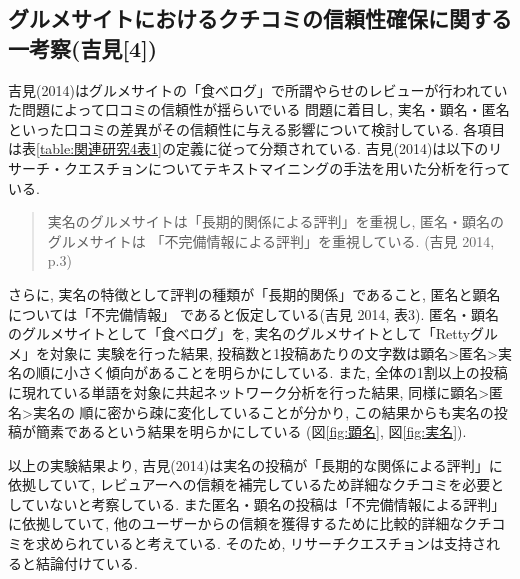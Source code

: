 \documentclass{ltjarticle}
\begin{document}
\subsection{グルメサイトにおけるクチコミの信頼性確保に関する一考察(吉見[4])}
吉見(2014)はグルメサイトの「食べログ」で所謂やらせのレビューが行われていた問題によって口コミの信頼性が揺らいでいる
問題に着目し, 実名・顕名・匿名といった口コミの差異がその信頼性に与える影響について検討している. 
各項目は表\ref{table:関連研究4表1}の定義に従って分類されている. 
吉見(2014)は以下のリサーチ・クエスチョンについてテキストマイニングの手法を用いた分析を行っている. 
\begin{quote}
    実名のグルメサイトは「長期的関係による評判」を重視し, 匿名・顕名のグルメサイトは
「不完備情報による評判」を重視している. (吉見 2014, p.3)
\end{quote}
さらに, 実名の特徴として評判の種類が「長期的関係」であること, 匿名と顕名については「不完備情報」
であると仮定している(吉見 2014, 表3). 
匿名・顕名のグルメサイトとして「食べログ」を, 実名のグルメサイトとして「Rettyグルメ」を対象に
実験を行った結果, 投稿数と1投稿あたりの文字数は顕名>匿名>実名の順に小さく傾向があることを明らかにしている. 
また, 全体の1割以上の投稿に現れている単語を対象に共起ネットワーク分析を行った結果, 同様に顕名>匿名>実名の
順に密から疎に変化していることが分かり, この結果からも実名の投稿が簡素であるという結果を明らかにしている
(図\ref{fig:顕名}, 図\ref{fig:実名}). 

以上の実験結果より, 吉見(2014)は実名の投稿が「長期的な関係による評判」に依拠していて, 
レビュアーへの信頼を補完しているため詳細なクチコミを必要としていないと考察している. 
また匿名・顕名の投稿は「不完備情報による評判」に依拠していて, 
他のユーザーからの信頼を獲得するために比較的詳細なクチコミを求められていると考えている. 
そのため, リサーチクエスチョンは支持されると結論付けている. 
\end{document}
